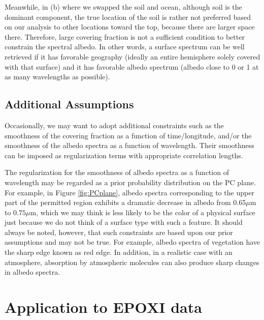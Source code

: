 \documentclass[iop,numberedappendix,apj,]{emulateapj}
\begin{document}
Meanwhile, in (b) where we swapped the soil and ocean, although soil is the dominant component, the true location of the soil is rather not preferred based on our analysis to other locations toward the top, because there are larger space there. 
Therefore, large covering fraction is not a sufficient condition to better constrain the spectral albedo. 
In other words, a surface spectrum can be well retrieved if it has favorable geography (ideally an entire hemisphere solely covered with that surface) and it has favorable albedo spectrum (albedo close to 0 or 1 at as many wavelengths as possible). 



\subsection{Additional Assumptions}
\label{ss:regularization}

Occasionally, we may want to adopt additional constraints such as the smoothness of the covering fraction as a function of time/longitude, and/or the smoothness of the albedo spectra as a function of wavelength. 
Their smoothness can be imposed as regularization terms with appropriate correlation lengths. 

The regularization for the smoothness of albedo spectra as a function of wavelength may be regarded as a prior probability distribution on the PC plane. 
For example, in Figure \ref{fig:PCplane}, albedo spectra corresponding to the upper part of the permitted region exhibits a dramatic decrease in albedo from 0.65$\mu $m to $0.75\mu $m, which we may think is less likely to be the color of a physical surface just because we do not think of a surface type with such a feature. 
It should always be noted, however, that such constraints are based upon our prior assumptions and may not be true. 
For example, albedo spectra of vegetation have the sharp edge known as red edge. 
In addition, in a realistic case with an atmosphere, absorption by atmospheric molecules can also produce sharp changes in albedo spectra. 




\section{Application to EPOXI data}
\label{s:EPOXI}
\end{document}
